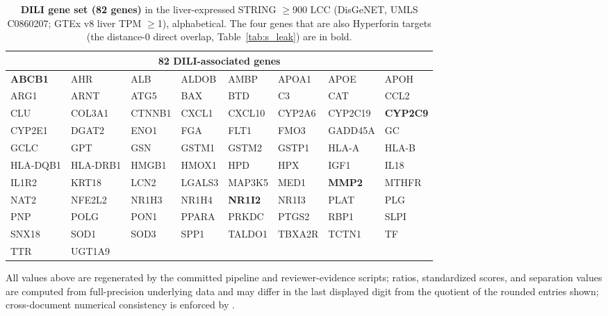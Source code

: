 \begin{table}[ht]
\centering
\caption{\textbf{DILI gene set (82 genes)} in the liver-expressed STRING $\geq$900 LCC (DisGeNET, UMLS C0860207; GTEx v8 liver TPM $\geq$1), alphabetical. The four genes that are also Hyperforin targets (the distance-0 direct overlap, Table~\ref{tab:s_leak}) are in bold.}
\label{tab:s_dili}
\scriptsize
\begin{tabular}{llllllll}
\toprule
\multicolumn{8}{c}{\textbf{82 DILI-associated genes}} \\
\midrule
\textbf{ABCB1} & AHR & ALB & ALDOB & AMBP & APOA1 & APOE & APOH \\
ARG1 & ARNT & ATG5 & BAX & BTD & C3 & CAT & CCL2 \\
CLU & COL3A1 & CTNNB1 & CXCL1 & CXCL10 & CYP2A6 & CYP2C19 & \textbf{CYP2C9} \\
CYP2E1 & DGAT2 & ENO1 & FGA & FLT1 & FMO3 & GADD45A & GC \\
GCLC & GPT & GSN & GSTM1 & GSTM2 & GSTP1 & HLA-A & HLA-B \\
HLA-DQB1 & HLA-DRB1 & HMGB1 & HMOX1 & HPD & HPX & IGF1 & IL18 \\
IL1R2 & KRT18 & LCN2 & LGALS3 & MAP3K5 & MED1 & \textbf{MMP2} & MTHFR \\
NAT2 & NFE2L2 & NR1H3 & NR1H4 & \textbf{NR1I2} & NR1I3 & PLAT & PLG \\
PNP & POLG & PON1 & PPARA & PRKDC & PTGS2 & RBP1 & SLPI \\
SNX18 & SOD1 & SOD3 & SPP1 & TALDO1 & TBXA2R & TCTN1 & TF \\
TTR & UGT1A9 & & & & & & \\
\bottomrule
\end{tabular}
\end{table}

\noindent\footnotesize All values above are regenerated by the committed pipeline and reviewer-evidence scripts; ratios, standardized scores, and separation values are computed from full-precision underlying data and may differ in the last displayed digit from the quotient of the rounded entries shown; cross-document numerical consistency is enforced by .
